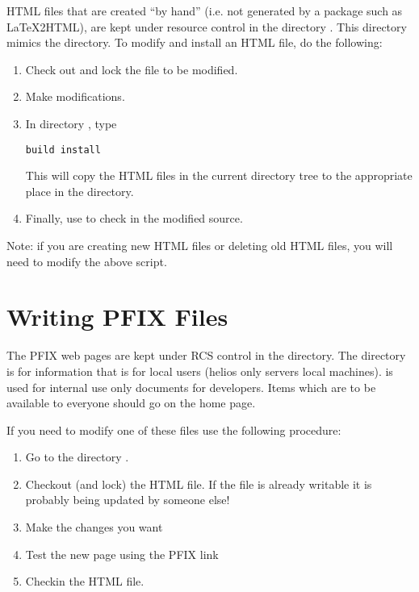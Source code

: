 HTML files that are created ``by hand'' (i.e. not generated by a package
such as LaTeX2HTML), are kept under resource control in the directory
.
This directory mimics the  directory.
To modify and install an HTML file, do the following:
\begin{enumerate}

\item
Check out and lock the file to be modified.

\item
Make modifications.

\item
In directory , type
\begin{display}\begin{verbatim}
build install
\end{verbatim}\end{display}
This will copy the HTML files in the current directory tree
to the appropriate place in the  directory.

\item
Finally, use  to check in the modified source.

\end{enumerate}
Note: if you are creating new HTML files or deleting old HTML
files, you will need to modify the above  script.



\section{Writing PFIX Files}
\label{Writing PFIX Files}

The PFIX web pages are kept under RCS control in the
 directory.  The  directory is for
information that is for local users (helios only servers local
machines).  is used for internal use only documents for
developers.  Items which are to be available to everyone should go on
the \parflow{} home page.

If you need to modify one of these files use the
following procedure:

\begin{enumerate}
\item Go to the directory .
\item Checkout (and lock) the HTML file.  If the file is already
writable it is probably being updated by someone else!
\item Make the changes you want
\item Test the new page using the PFIX link
\item Checkin the HTML file.
\end{enumerate}

